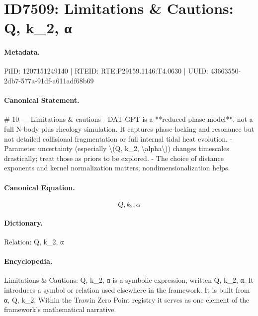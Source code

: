 \section*{ID7509: Limitations \& Cautions: Q, k\_2, α}
\paragraph{Metadata.}
PiID: 1207151249140 | RTEID: RTE:P29159.1146:T4.0630 | UUID: 43663550-2db7-577a-91df-a611adf68b69

\paragraph{Canonical Statement.}
\# 10 — Limitations \& cautions - DAT-GPT is a **reduced phase model**, not a full N-body plus rheology simulation. It captures phase-locking and resonance but not detailed collisional fragmentation or full internal tidal heat evolution. - Parameter uncertainty (especially \textbackslash{}(Q, k\_2, \textbackslash{}alpha\textbackslash{})) changes timescales drastically; treat those as priors to be explored. - The choice of distance exponents and kernel normalization matters; nondimensionalization helps.

\paragraph{Canonical Equation.}
\[
Q, k_2, \alpha
\]

\paragraph{Dictionary.}
Relation: Q, k\_2, α

\paragraph{Encyclopedia.}
Limitations \& Cautions: Q, k\_2, α is a symbolic expression, written Q, k\_2, α. It introduces a symbol or relation used elsewhere in the framework. It is built from α, Q, k\_2. Within the Trawin Zero Point registry it serves as one element of the framework's mathematical narrative.
